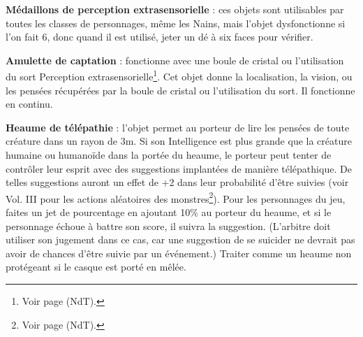 {\bigskip

\label{objet-medaillon-esp}\textbf{Médaillons de perception extrasensorielle} : ces objets sont utilisables par toutes les classes de personnages, même les Nains, mais l'objet dysfonctionne si l'on fait 6, donc quand il est utilisé, jeter un dé à six faces pour vérifier.

\bigskip

\label{objet-amulette-captation}\textbf{Amulette de captation} : fonctionne avec une boule de cristal ou l'utilisation du sort Perception extrasensorielle\footnote{Voir page \pageref{sort-esp} (NdT).}. Cet objet donne la localisation, la vision, ou les pensées récupérées par la boule de cristal ou l'utilisation du sort. Il fonctionne en continu.

\bigskip

\label{objet-heaume-telepathie}\textbf{Heaume de télépathie} : l'objet permet au porteur de lire les pensées de toute créature dans un rayon de 3m. Si son Intelligence est plus grande que la créature humaine ou humanoïde dans la portée du heaume, le porteur peut tenter de contrôler leur esprit avec des suggestions implantées de manière télépathique. De telles suggestions auront un effet de +2 dans leur probabilité d'être suivies (voir Vol. III pour les actions aléatoires des monstres\footnote{Voir page \pageref{dd3-actions-monstres} (NdT).}). Pour les personnages du jeu, faites un jet de pourcentage en ajoutant 10\% au porteur du heaume, et si le personnage échoue à battre son score,%
il suivra la suggestion. (L'arbitre doit utiliser son jugement dans ce cas, car une suggestion de se suicider ne devrait pas avoir de chances d'être suivie par un événement.) Traiter comme un heaume non protégeant si le casque est porté en mêlée.

}%


